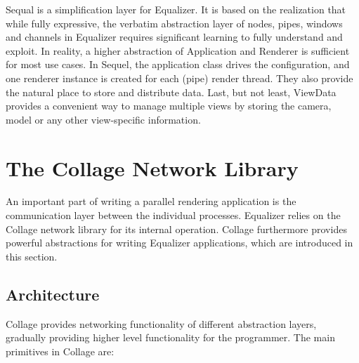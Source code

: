 \documentclass[10pt,journal,compsoc]{IEEEtran}
\begin{document}
Sequal is a simplification layer for Equalizer. It is based on the realization
that while fully expressive, the verbatim abstraction layer of nodes, pipes,
windows and channels in Equalizer requires significant learning to fully
understand and exploit. In reality, a higher abstraction of \textsf{Application}
and \textsf{Renderer} is sufficient for most use cases. In Sequel, the
application class drives the configuration, and one renderer instance is created
for each (pipe) render thread. They also provide the natural place to store and
distribute data. Last, but not least, \textsf{ViewData} provides a convenient
way to manage multiple views by storing the camera, model or any other
view-specific information.

\section{The Collage Network Library}

An important part of writing a parallel rendering application is the
communication layer between the individual processes. Equalizer relies on the
Collage network library for its internal operation. Collage furthermore provides
powerful abstractions for writing Equalizer applications, which are introduced
in this section.

\subsection{Architecture}

Collage provides networking functionality of different abstraction layers,
gradually providing higher level functionality for the programmer. The main
primitives in Collage are:
\end{document}
